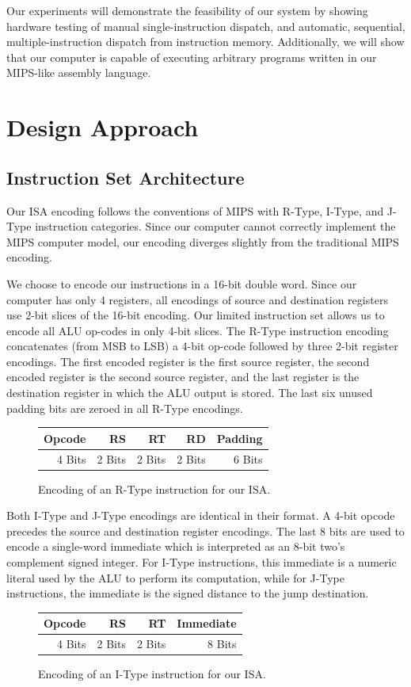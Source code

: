 \documentclass[12pt, letterpaper]{article}
\begin{document}
Our experiments will demonstrate the feasibility of our system by showing hardware testing of manual single-instruction dispatch, and automatic, sequential, multiple-instruction dispatch from instruction memory.  Additionally, we will show that our computer is capable of executing arbitrary programs written in our MIPS-like assembly language.  

\newpage
\section{Design Approach}

\subsection{Instruction Set Architecture}
Our ISA encoding follows the conventions of MIPS with R-Type, I-Type, and J-Type instruction categories.  Since our computer cannot correctly implement the MIPS computer model, our encoding diverges slightly from the traditional MIPS encoding. 

We choose to encode our instructions in a 16-bit double word.  Since our computer has only 4 registers, all encodings of source and destination registers use 2-bit slices of the 16-bit encoding.  Our limited instruction set allows us to encode all ALU op-codes in only 4-bit slices.  The R-Type instruction encoding concatenates (from MSB to LSB) a 4-bit op-code followed by three 2-bit register encodings.  The first encoded register is the first source register, the second encoded register is the second source register, and the last register is the destination register in which the ALU output is stored.  The last six unused padding bits are zeroed in all R-Type encodings.
\begin{figure}[h]
\centering
\begin{tabular}{|r|r|r|r|r|}
\hline
Opcode & RS     & RT     & RD     & Padding \\
\hline
4 Bits & 2 Bits & 2 Bits & 2 Bits & 6 Bits \\ 
\hline
\end{tabular}
\caption{Encoding of an R-Type instruction for our ISA.}
\end{figure}

Both I-Type and J-Type encodings are identical in their format.  A 4-bit opcode precedes the source and destination register encodings.  The last 8 bits are used to encode a single-word immediate which is interpreted as an 8-bit two's complement signed integer.  For I-Type instructions, this immediate is a numeric literal used by the ALU to perform its computation, while for J-Type instructions, the immediate is the signed distance to the jump destination.
\begin{figure}[h]
\centering
\begin{tabular}{|r|r|r|r|}
\hline
Opcode & RS     & RT     & Immediate \\ 
\hline
4 Bits & 2 Bits & 2 Bits & 8 Bits \\
\hline
\end{tabular}
\caption{Encoding of an I-Type instruction for our ISA.}
\end{figure}
\end{document}
